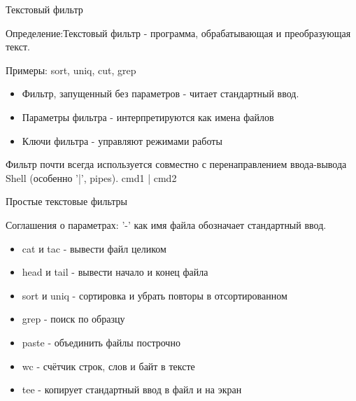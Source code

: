 \begin{frame}{Текстовый фильтр}

  Определение:\newline \alert{Текстовый фильтр} - программа, обрабатывающая и преобразующая текст. \newline

  Примеры: \alert{sort}, \alert{uniq}, \alert{cut}, \alert{grep} \pause
  \begin{itemize}
    \item Фильтр, запущенный без параметров - читает стандартный ввод.
    \item Параметры фильтра - интерпретируются как имена файлов
    \item Ключи фильтра - управляют режимами работы
  \end{itemize} \pause

  Фильтр почти всегда используется совместно с перенаправлением ввода-вывода Shell (особенно '|', pipes). cmd1 | cmd2

\end{frame}

\begin{frame}{Простые текстовые фильтры}

  Соглашения о параметрах: \alert{'-'} как имя файла обозначает стандартный ввод.

  \begin{itemize}
    \item \alert{cat} и \alert{tac} - вывести файл целиком \pause
    \item \alert{head} и \alert{tail} - вывести начало и конец файла \pause
    \item \alert{sort} и \alert{uniq} - сортировка и убрать повторы в отсортированном \pause
    \item \alert{grep} - поиск по образцу \pause
    \item \alert{paste} - объединить файлы построчно \pause
    \item \alert{wc} - счётчик строк, слов и байт в тексте \pause
    \item \alert{tee} - копирует стандартный ввод в файл и на экран

  \end{itemize}
\end{frame}

%

